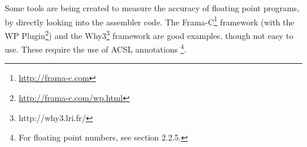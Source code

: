 




Some tools are being created to measure the accuracy of floating point programs, by directly looking into the assembler code. The Frama-C\footnote{\url{http://frama-c.com}} framework (with the WP Plugin\footnote{\url{http://frama-c.com/wp.html}}) and the Why3\footnote{http://why3.lri.fr/} framework are good examples, though not easy to use. These require the use of ACSL annotations \cite{ACSL}\footnote{For floating point numbers, see section 2.2.5.}.


